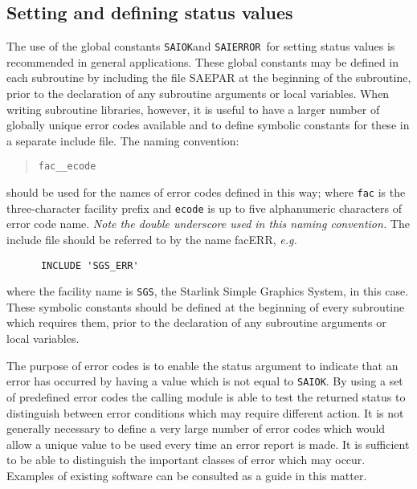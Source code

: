 \documentclass[twoside,11pt]{article}
\newcommand{\xlabel}[1]{}
\renewcommand{\_}{\texttt{\symbol{95}}}
\newcommand{\const}[1]{\texttt{#1}}
\newcommand{\saiok}{\const{SAI\_\_OK}}
\newcommand{\saierr}{\const{SAI\_\_ERROR}}
\begin{document}
\subsection{\xlabel{setting_and_defining_status_values}Setting and defining status values \label{def_sect}}

The use of the global constants \saiok and \saierr\ for setting
status values is recommended in general applications. 
These global constants may be defined in each subroutine by including the
file SAE\_PAR at the beginning of the subroutine, prior to the declaration
of any subroutine arguments or local variables. 
When writing subroutine libraries, however, it is useful to have a larger 
number of globally unique error codes available and to define symbolic
constants for these in a separate include 
file.
The naming convention:

\begin {quote}
\begin {small}
\begin{verbatim}
fac__ecode
\end{verbatim}
\end {small}
\end {quote}

should be used for the names of error codes defined in this way; where 
\texttt{fac} is the three-character facility prefix and \texttt{ecode} is up 
to five alphanumeric characters of error code name. 
\emph{Note the double underscore used in this naming convention.}
The include file should be referred to by the name fac\_ERR, \textit{e.g.}

\begin {small}
\begin{verbatim}
      INCLUDE 'SGS_ERR'
\end{verbatim}
\end {small}

where the facility name is \texttt{SGS}, the Starlink Simple Graphics System,
in this case. 
These symbolic constants should be defined at the beginning of every
subroutine which requires them, prior to the declaration of any subroutine
arguments or local variables. 

The purpose of error codes is to enable the status argument to indicate that an 
error has occurred by having a value which is not equal to \saiok.
By using a set of predefined error codes the calling module is 
able to test the returned status to distinguish between error conditions 
which may require different action.
It is not generally necessary to define a very large number of error codes
which would allow a unique value to be used every time an error report is
made. 
It is sufficient to be able to distinguish the important classes of error which
may occur. 
Examples of existing software can be consulted as a guide in this matter.
\end{document}
